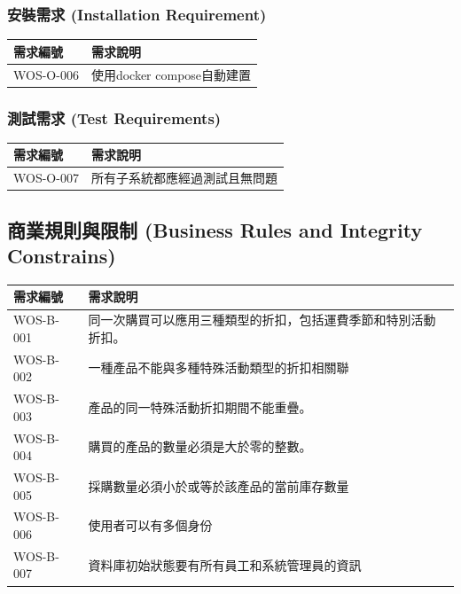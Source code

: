 \documentclass[a4paper, 12pt]{article}
\begin{document}
\subsubsection{安裝需求 (Installation Requirement)}
\begin{center}
    \begin{tabular}{ | p{6.5em} | p{32em} |}
    \hline
    需求編號 & 需求說明 \\ 
    \hline
    WOS-O-006 & 使用docker compose自動建置\\ 
    \hline
    \end{tabular}
\end{center}

\subsubsection{測試需求 (Test Requirements)}
\begin{center}
    \begin{tabular}{ | p{6.5em} | p{32em} |}
    \hline
    需求編號 & 需求說明 \\ 
    \hline
    WOS-O-007 & 所有子系統都應經過測試且無問題\\ 
    \hline
    \end{tabular}
\end{center}

\subsection{商業規則與限制 (Business Rules and Integrity Constrains)}

\noindent\begin{tabular}{ | p{6.5em} | p{32em} |}
\hline
需求編號 & 需求說明 \\ 
\hline
WOS-B-001 & 同一次購買可以應用三種類型的折扣，包括運費季節和特別活動折扣。\\
\hline
WOS-B-002 & 一種產品不能與多種特殊活動類型的折扣相關聯\\
\hline
WOS-B-003 & 產品的同一特殊活動折扣期間不能重疊。\\
\hline
WOS-B-004 & 購買的產品的數量必須是大於零的整數。\\
\hline
WOS-B-005 & 採購數量必須小於或等於該產品的當前庫存數量    \\
\hline
WOS-B-006 & 使用者可以有多個身份 \\
\hline
WOS-B-007 & 資料庫初始狀態要有所有員工和系統管理員的資訊 \\
\hline
\end{tabular}
\end{document}
